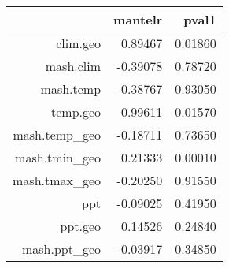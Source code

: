 \begin{table}[ht]
\centering
\begin{tabular}{rrr}
  \hline
 & mantelr & pval1 \\ 
  \hline
clim.geo & 0.89467 & 0.01860 \\ 
  mash.clim & -0.39078 & 0.78720 \\ 
  mash.temp & -0.38767 & 0.93050 \\ 
  temp.geo & 0.99611 & 0.01570 \\ 
  mash.temp\_geo & -0.18711 & 0.73650 \\ 
  mash.tmin\_geo & 0.21333 & 0.00010 \\ 
  mash.tmax\_geo & -0.20250 & 0.91550 \\ 
  ppt & -0.09025 & 0.41950 \\ 
  ppt.geo & 0.14526 & 0.24840 \\ 
  mash.ppt\_geo & -0.03917 & 0.34850 \\ 
   \hline
\end{tabular}
\end{table}
